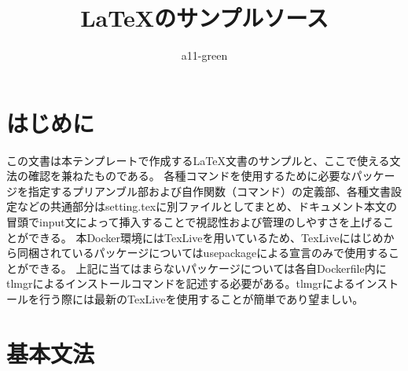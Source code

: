 \documentclass[uplatex]{jsarticle}
\title{\LaTeX のサンプルソース}
\author{a11-green}
\begin{document}
\maketitle
\tableofcontents

\newpage
\section{はじめに}
この文書は本テンプレートで作成する\LaTeX 文書のサンプルと、ここで使える文法の確認を兼ねたものである。
各種コマンドを使用するために必要なパッケージを指定するプリアンブル部および自作関数（コマンド）の定義部、各種文書設定などの共通部分はsetting.texに別ファイルとしてまとめ、ドキュメント本文の冒頭でinput文によって挿入することで視認性および管理のしやすさを上げることができる。
本Docker環境にはTexLiveを用いているため、TexLiveにはじめから同梱されているパッケージについてはusepackageによる宣言のみで使用することができる。
上記に当てはまらないパッケージについては各自Dockerfile内にtlmgrによるインストールコマンドを記述する必要がある。tlmgrによるインストールを行う際には最新のTexLiveを使用することが簡単であり望ましい。

\section{基本文法}
\end{document}
